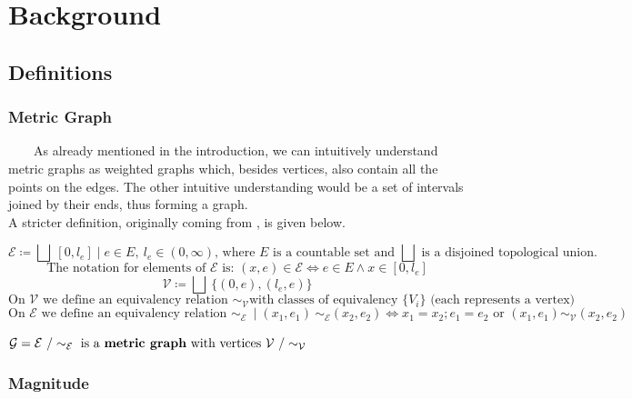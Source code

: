 \documentclass{article}
\begin{document}
\section{Background}
\subsection{Definitions}
\subsubsection{Metric Graph}

\ \ \ \ As already mentioned in the introduction, we can intuitively understand metric graphs as 
weighted graphs which, besides vertices, also contain all the points on the edges. 
The other intuitive understanding would be a set of intervals joined by their ends,
thus forming a graph. \\

A stricter definition, originally coming from \textcite{MG1}, is given below. 

$$\mathcal{E} \coloneqq \bigsqcup \ [0, l_{e}] \mid e \in E, \  l_e \in (0, \infty) \text{, where } E \text{ is a countable set and } \bigsqcup \text{ is a disjoined topological union.}$$
$$\text{The notation for elements of $\mathcal{E}$ is: }(x, e) \in \mathcal{E} \iff e \in E \land x \in [0, l_e]$$
$$\mathcal{V} \coloneqq \bigsqcup \ \{(0, e), (l_e, e)\}$$
$$\text{On } \mathcal{V} \text{ we define an equivalency relation } \sim_{\mathcal{V}} \text{with classes of equivalency } \{V_i\} \text{ (each represents a vertex)}$$
$$\text{On } \mathcal{E} \text{ we define an equivalency relation } \sim_{\mathcal{E}} \ \mid (x_1, e_1) \ \sim_{\mathcal{E}} (x_2, e_2) \iff x_1 = x_2; e_1 = e_2 \text{ or } (x_1, e_1) \sim_{\mathcal{V}} (x_2, e_2)$$
\begin{definition}
    $\mathcal{G} = \mathcal{E} \ \slash \sim_{\mathcal{E}} \text{ is a \textbf{metric graph} with vertices } \mathcal{V} \ \slash \sim_{\mathcal{V}}$
\end{definition}
\subsubsection{Magnitude}
\end{document}
